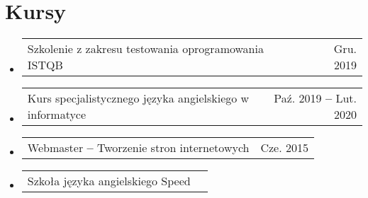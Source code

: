 \documentclass[A4,11pt]{article}
\makeatletter
\newcommand{\CVSubSubheading}[2]{
  \item
    \begin{tabular*}{0.97\textwidth}{l@{\extracolsep{\fill}}r}
      \small#1 & \small #2 \\
    \end{tabular*}\vspace{-4pt}
}
\newcommand{\CVSubHeadingListStart}{\begin{itemize}[leftmargin=0.5cm, label={}]}
\newcommand{\CVSubHeadingListEnd}{\end{itemize}}
\makeatother
\begin{document}
\section{Kursy}
  \CVSubHeadingListStart
    \CVSubSubheading{Szkolenie z zakresu testowania oprogramowania ISTQB}{Gru. 2019}
    \CVSubSubheading{Kurs specjalistycznego języka angielskiego w informatyce}{Paź. 2019 \textbf{--} Lut. 2020}
    \CVSubSubheading{Webmaster \textbf{--} Tworzenie stron internetowych}{Cze. 2015}
    \CVSubSubheading{Szkoła języka angielskiego Speed}{}
  \CVSubHeadingListEnd
\end{document}
